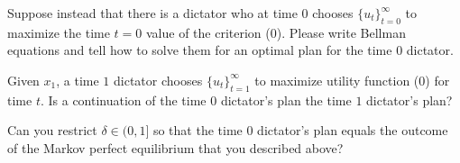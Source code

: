 \medskip

 Suppose instead that there is a dictator who at time $0$ chooses $\{u_t\}_{t=0}^\infty$ to maximize the time $t=0$ value
of the criterion (0). Please write  Bellman equations and tell how to solve them for an optimal plan for the time $0$  dictator.

\medskip
{}
Given $x_1$, a time $1$ dictator chooses $\{u_t\}_{t=1}^\infty$ to maximize utility function (0) for time $t$.
Is a continuation of the time $0$ dictator's plan the time $1$  dictator's plan?


\medskip
{} Can you restrict $\delta \in (0,1]$ so that the  time $0$ dictator's  plan equals the outcome of the Markov
perfect equilibrium that you described above?


%

\medskip
